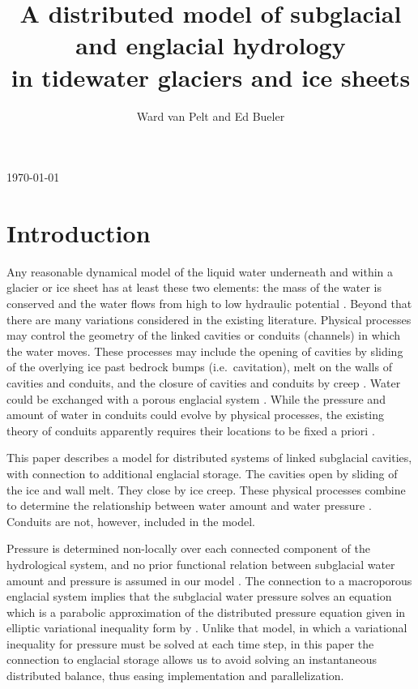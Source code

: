 \documentclass[11pt,final]{amsart}
\title[]{A distributed model of subglacial and englacial hydrology \\ in tidewater glaciers and ice sheets}
\author[]{Ward van Pelt and Ed Bueler}
\begin{document}
\graphicspath{{figs/}}

\scriptsize \hfill \today \normalsize
\vspace{0.5in}

\maketitle
\thispagestyle{empty}

\section{Introduction}

Any reasonable dynamical model of the liquid water underneath and within a glacier or ice sheet has at least these two elements: the mass of the water is conserved and the water flows from high to low hydraulic potential \citep{Clarke05}.  Beyond that there are many variations considered in the existing literature.  Physical processes may control the geometry of the linked cavities \citep{Kamb1987} or conduits (channels) \citep{Nye1976} in which the water moves.  These processes may include the opening of cavities by sliding of the overlying ice past bedrock bumps (i.e.~cavitation), melt on the walls of cavities and conduits, and the closure of cavities and conduits by creep \citep{Hewitt2011}.  Water could be exchanged with a porous englacial system \citep{Bartholomausetal2011}.  While the pressure and amount of water in conduits could evolve by physical processes, the existing theory of conduits apparently requires their locations to be fixed a priori \citep{PimentelFlowers2011,Schoofmeltsupply}.

This paper describes a model for distributed systems of linked subglacial cavities, with connection to additional englacial storage.  The cavities open by sliding of the ice and wall melt.  They close by ice creep.  These physical processes combine to determine the relationship between water amount and water pressure \citep{Schoofetal2012}.  Conduits are not, however, included in the model.

Pressure is determined non-locally over each connected component of the hydrological system, and no prior functional relation between subglacial water amount and pressure is assumed in our model \citep[compare][]{FlowersClarke2002_theory}.  The connection to a macroporous englacial system implies that the subglacial water pressure solves an equation which is a parabolic approximation of the distributed pressure equation given in elliptic variational inequality form by \cite{Schoofetal2012}.  Unlike that model, in which a variational inequality for pressure must be solved at each time step, in this paper the connection to englacial storage allows us to avoid solving an instantaneous distributed balance, thus easing implementation and parallelization.
\end{document}
